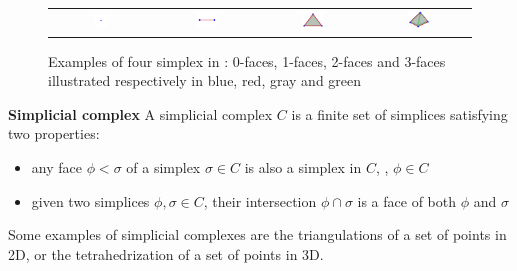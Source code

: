 \begin{figure}[t]
\centering
\begin{tabular}{cccc}
\includegraphics[width=0.15\textwidth]{./img/simplex01}&
\includegraphics[width=0.21\textwidth]{./img/simplex02}&
\includegraphics[width=0.21\textwidth]{./img/simplex03}&
\includegraphics[width=0.21\textwidth]{./img/simplex04}
\end{tabular}
\caption{Examples of four simplex in \Rthree: 0-faces, 1-faces, 2-faces and 3-faces illustrated respectively in blue, red, gray and green}
\label{fig:simplices}
\end{figure}


\begin{mydef}
\textbf{Simplicial complex}
A simplicial complex $C$ is a finite set of simplices satisfying two properties:
\begin{itemize}
  \item any face $\phi < \sigma$ of a simplex $\sigma \in C$ is also a simplex in $C$, \ie, $\phi \in C$
  \item given two simplices $\phi, \sigma \in C$, their intersection $\phi \cap \sigma$ is a face of both $\phi$ and $\sigma$
\end{itemize}
\end{mydef}
Some examples of simplicial complexes are the triangulations of a set of points in 2D, or the tetrahedrization of a set of points in 3D.

